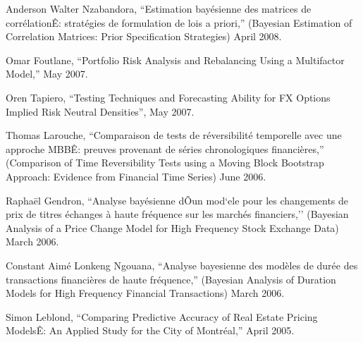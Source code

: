 \documentclass[12pt]{article}
\begin{document}
Anderson Walter Nzabandora,
``Estimation bay\'esienne des matrices de corr\'elationÊ: strat\'egies de formulation de lois a priori,''
(Bayesian Estimation of Correlation Matrices: Prior Specification Strategies)
April 2008.

Omar Foutlane,
``Portfolio Risk Analysis and Rebalancing Using a Multifactor Model,''
May 2007.

Oren Tapiero,
``Testing Techniques and Forecasting Ability for FX Options Implied Risk
Neutral Densities'',
May 2007.

Thomas Larouche,
``Comparaison de tests de r\'eversibilit\'e temporelle avec une approche MBBÊ: preuves provenant de s\'eries chronologiques financi\`eres,''
(Comparison of Time Reversibility Tests using a Moving Block Bootstrap Approach: Evidence from Financial Time Series)
June 2006.

Rapha\"el Gendron,
``Analyse bay\'esienne dÕun mod`ele pour les changements de prix de titres \'echanges \`a haute fr\'equence sur les march\'es financiers,''
(Bayesian Analysis of a Price Change Model for High Frequency Stock Exchange
Data)
March 2006.

Constant Aim\'e Lonkeng Ngouana,
``Analyse bayesienne des mod\`eles de dur\'ee des transactions financi\`eres de haute fr\'equence,''
(Bayesian Analysis of Duration Models for High Frequency Financial Transactions)
March 2006.

Simon Leblond,
``Comparing Predictive Accuracy of Real Estate Pricing ModelsÊ: An Applied Study for the City of Montr\'eal,''
April 2005.
\end{document}
